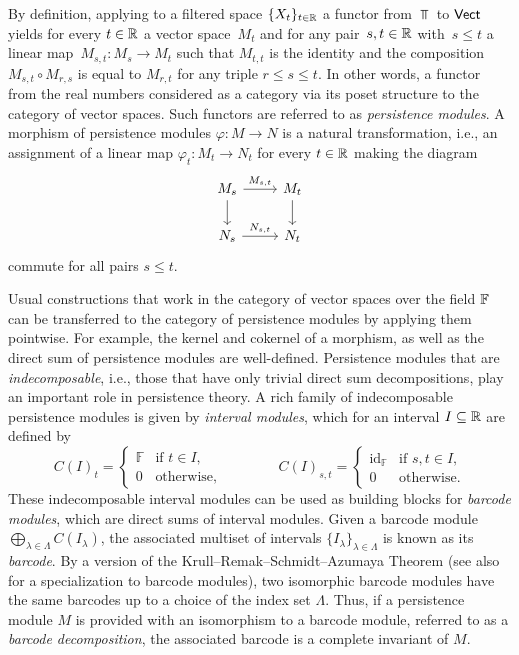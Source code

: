 By definition, applying to a filtered space $\{X_t\}_{t \in \mathbb{R}}$ a functor from $\Top$ to $\mathsf{Vect}$ yields for every $t \in \mathbb{R}$ a vector space~$M_t$ and for any pair~$s, t \in \mathbb{R}$ with~$s \leq t$ a linear map~$M_{s,t} \colon M_s \to M_t$ such that $M_{t,t}$ is the identity and the composition $M_{s,t} \circ M_{r,s}$ is equal to $M_{r,t}$ for any triple $r \leq s \leq t$.
In other words, a functor from the real numbers considered as a category via its poset structure to the category of vector spaces.
Such functors are referred to as \emph{persistence modules}.
A morphism of persistence modules $\varphi \colon M \to N$ is a natural transformation, i.e., an assignment of a linear map $\varphi_t \colon M_t \to N_t$ for every $t \in \mathbb{R}$ making the diagram
\begin{equation*}
    \begin{tikzcd}
    M_{s} \arrow[r, "M_{s,t}"] \arrow[d] & M_{t} \arrow[d] \\
    N_{s} \arrow[r, "N_{s,t}"] & N_{t}
    \end{tikzcd}
\end{equation*}
commute for all pairs $s \leq t$.

Usual constructions that work in the category of vector spaces over the field $\mathbb{F}$ can be transferred to the category of persistence modules by applying them pointwise.
For example, the kernel and cokernel of a morphism, as well as the direct sum of persistence modules are well-defined.
Persistence modules that are \emph{indecomposable}, i.e., those that have only trivial direct sum decompositions, play an important role in persistence theory.
A rich family of indecomposable persistence modules is given by \emph{interval modules}, which for an interval $I \subseteq \mathbb{R}$ are defined by
\begin{equation} \label{e:interval module}
    C(I)_t =
    \begin{cases}
        \mathbb{F} & \text{if } t \in I, \\
        0          & \text{otherwise},
    \end{cases}
    \qquad
    \qquad
    C(I)_{s, t} =
    \begin{cases}
        \operatorname{id}_{\mathbb{F}} & \text{if } s, t \in I,\\
        0 & \text{otherwise}.
    \end{cases}    
\end{equation}
These indecomposable interval modules can be used as building blocks for \emph{barcode modules}, which are direct sums of interval modules.
Given a barcode module $\bigoplus_{\lambda \in \Lambda} C(I_{\lambda})$, the associated multiset of intervals $\{I_{\lambda}\}_{\lambda \in \Lambda}$ is known as its \textit{barcode}.
By a version of the Krull--Remak--Schmidt--Azumaya Theorem \cite{MR37832} (see also \cite[Theorem 2.7]{Chazal.2016a} for a specialization to barcode modules), two isomorphic barcode modules have the same barcodes up to a choice of the index set $\Lambda$.
Thus, if a persistence module $M$ is provided with an isomorphism to a barcode module, referred to as a \emph{barcode decomposition}, the associated barcode is a complete invariant of $M$.

